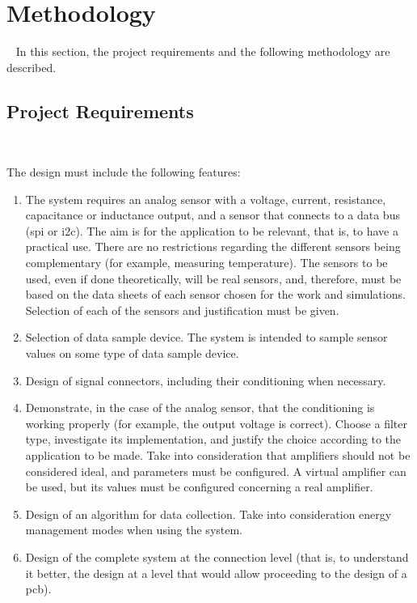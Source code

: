 \section{Methodology}
~\label{sec:methodology}
\hspace{12pt}
In this section, the project requirements and the following methodology are described.

\subsection{Project Requirements}
~\label{sec:methodology:project_reqs}
\hspace{8pt}

The design must include the following features:

\begin{enumerate}
    \item The system requires an analog sensor with a voltage, current, resistance, capacitance or inductance output, and a sensor that connects to a data bus (\acrfull{spi} or \acrfull{i2c}). The aim is for the application to be relevant, that is, to have a practical use. There are no restrictions regarding the different sensors being complementary (for example, measuring temperature). The sensors to be used, even if done theoretically, will be real sensors, and, therefore, must be based on the data sheets of each sensor chosen for the work and simulations. Selection of each of the sensors and justification must be given.

    \item Selection of data sample device. The system is intended to sample sensor values on some type of data sample device.

    \item Design of signal connectors, including their conditioning when necessary.

    \item Demonstrate, in the case of the analog sensor, that the conditioning is working properly (for example, the output voltage is correct). Choose a filter type, investigate its implementation, and justify the choice according to the application to be made. Take into consideration that amplifiers should not be considered ideal, and parameters must be configured. A virtual amplifier can be used, but its values must be configured concerning a real amplifier.

    \item Design of an algorithm for data collection. Take into consideration energy management modes when using the system.

    \item Design of the complete system at the connection level (that is, to understand it better, the design at a level that would allow proceeding to the design of a \acrfull{pcb}).
\end{enumerate}


